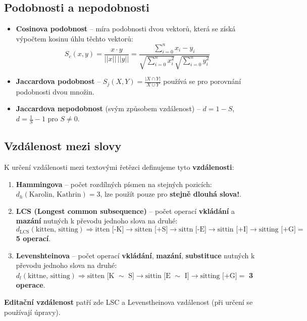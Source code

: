 \subsection{Podobnosti a nepodobnosti}
\begin{itemize}
    \item \textbf{Cosinova podobnost} -- míra podobnosti dvou vektorů, která se získá výpočtem kosinu úhlu těchto vektorů:
          \begin{equation*}
              S_c(x, y) = \frac{x \cdot y}{||x|| \, ||y||} = \frac{\sum_{i = 0}^{n} x_i - y_i}{\sqrt{\sum_{i = 0}^{n} x_i^2} \sqrt{\sum_{i = 0}^{n} y_i^2}}
          \end{equation*}
    \item \textbf{Jaccardova podobnost} -- $S_j(X, Y) = \frac{|X \cap Y|}{X \cup Y}$ používá se pro porovnání podobnosti dvou množin.
    \item \textbf{Jaccardova nepodobnost} (svým způsobem vzdálenost) -- $d = 1 - S$, $d = \frac{1}{S} - 1$ pro $S \neq 0$.
\end{itemize}

\subsection{Vzdálenost mezi slovy}
K určení vzdálenosti mezi textovými řetězci definujeme tyto \textbf{vzdálenosti}:
\begin{enumerate}
    \item \textbf{Hammingova} -- počet rozdílných písmen na stejných pozicích: $d_h(\textrm{Karolin, Kathrin}) = 3$, lze použít pouze pro \textbf{stejně dlouhá slova!}.
    \item \textbf{LCS (Longest common subsequence)} -- počet operací \textbf{vkládání} a \textbf{mazání} nutných k převodu jednoho slova na druhé: $d_{\textrm{LCS}  }(\textrm{kitten, sitting}) \Rightarrow \textrm{itten [-K]} \rightarrow \textrm{sitten [+S]} \rightarrow \textrm{sittn [-E]} \rightarrow \textrm{sittin [+I]} \rightarrow \textrm{sitting [+G]} =$ \textbf{5 operací}.
    \item \textbf{Levenshteinova} -- počet operací \textbf{vkládání}, \textbf{mazání}, \textbf{substituce}  nutných k převodu jednoho slova na druhé: $d_l(\textrm{kittne, sitting}) \Rightarrow \textrm{sitten [K }\sim \textrm{ S]} \rightarrow \textrm{sittin [E }\sim \textrm{ I]} \rightarrow \textrm{sitting [+G]} =$ \textbf{3 operace}.
\end{enumerate}
\textbf{Editační vzdálenost} patří zde LSC a Levenstheinova vzdálenost (při určení se používají úpravy).

